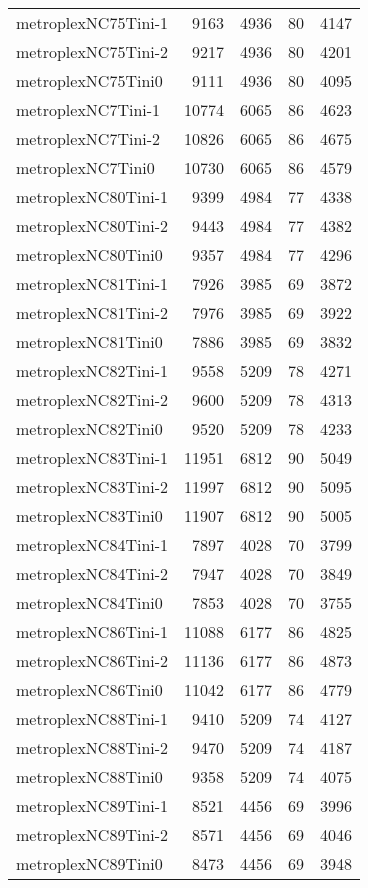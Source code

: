 \begin{longtable}{lrrrr}
metroplexNC75Tini-1 & 9163 & 4936 & 80 & 4147 \\
metroplexNC75Tini-2 & 9217 & 4936 & 80 & 4201 \\
metroplexNC75Tini0 & 9111 & 4936 & 80 & 4095 \\
metroplexNC7Tini-1 & 10774 & 6065 & 86 & 4623 \\
metroplexNC7Tini-2 & 10826 & 6065 & 86 & 4675 \\
metroplexNC7Tini0 & 10730 & 6065 & 86 & 4579 \\
metroplexNC80Tini-1 & 9399 & 4984 & 77 & 4338 \\
metroplexNC80Tini-2 & 9443 & 4984 & 77 & 4382 \\
metroplexNC80Tini0 & 9357 & 4984 & 77 & 4296 \\
metroplexNC81Tini-1 & 7926 & 3985 & 69 & 3872 \\
metroplexNC81Tini-2 & 7976 & 3985 & 69 & 3922 \\
metroplexNC81Tini0 & 7886 & 3985 & 69 & 3832 \\
metroplexNC82Tini-1 & 9558 & 5209 & 78 & 4271 \\
metroplexNC82Tini-2 & 9600 & 5209 & 78 & 4313 \\
metroplexNC82Tini0 & 9520 & 5209 & 78 & 4233 \\
metroplexNC83Tini-1 & 11951 & 6812 & 90 & 5049 \\
metroplexNC83Tini-2 & 11997 & 6812 & 90 & 5095 \\
metroplexNC83Tini0 & 11907 & 6812 & 90 & 5005 \\
metroplexNC84Tini-1 & 7897 & 4028 & 70 & 3799 \\
metroplexNC84Tini-2 & 7947 & 4028 & 70 & 3849 \\
metroplexNC84Tini0 & 7853 & 4028 & 70 & 3755 \\
metroplexNC86Tini-1 & 11088 & 6177 & 86 & 4825 \\
metroplexNC86Tini-2 & 11136 & 6177 & 86 & 4873 \\
metroplexNC86Tini0 & 11042 & 6177 & 86 & 4779 \\
metroplexNC88Tini-1 & 9410 & 5209 & 74 & 4127 \\
metroplexNC88Tini-2 & 9470 & 5209 & 74 & 4187 \\
metroplexNC88Tini0 & 9358 & 5209 & 74 & 4075 \\
metroplexNC89Tini-1 & 8521 & 4456 & 69 & 3996 \\
metroplexNC89Tini-2 & 8571 & 4456 & 69 & 4046 \\
metroplexNC89Tini0 & 8473 & 4456 & 69 & 3948 \\

\end{longtable}

